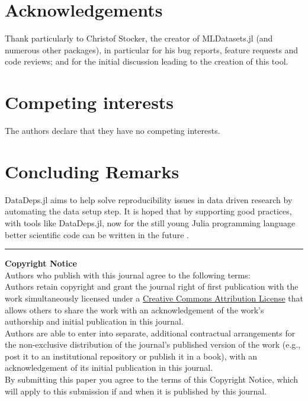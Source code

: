 \documentclass[dvinames]{josr}
\begin{document}
\section*{Acknowledgements}
Thank particularly to Christof Stocker, the creator of MLDatasets.jl (and numerous other packages), in particular for his bug reports, feature requests and code reviews; and for the initial discussion leading to the creation of this tool.


\section*{Competing interests}
The authors declare that they have no competing interests.

\section {Concluding Remarks} 
DataDeps.jl aims to help solve reproducibility issues in data driven research by automating the data setup step. 
It is hoped that by supporting good practices, with tools like DataDeps.jl, now for the still young Julia programming language 
better scientific code can be written in the future . 

\newpage






\vspace{2cm}

\rule{\textwidth}{1pt}

{ \bf Copyright Notice} \\
Authors who publish with this journal agree to the following terms: \\

Authors retain copyright and grant the journal right of first publication with the work simultaneously licensed under a  \href{http://creativecommons.org/licenses/by/3.0/}{Creative Commons Attribution License} that allows others to share the work with an acknowledgement of the work's authorship and initial publication in this journal. \\

Authors are able to enter into separate, additional contractual arrangements for the non-exclusive distribution of the journal's published version of the work (e.g., post it to an institutional repository or publish it in a book), with an acknowledgement of its initial publication in this journal. \\

By submitting this paper you agree to the terms of this Copyright Notice, which will apply to this submission if and when it is published by this journal.
\end{document}
